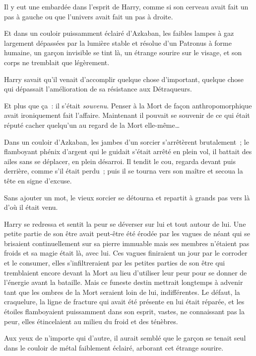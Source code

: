 Il y eut une embardée dans l'esprit de Harry, comme si son cerveau avait fait un pas à gauche ou que l'univers avait fait un pas à droite.

Et dans un couloir puissamment éclairé d'Azkaban, les faibles lampes à gaz largement dépassées par la lumière stable et résolue d'un Patronus à forme humaine, un garçon invisible se tint là, un étrange sourire sur le visage, et son corps ne tremblait que légèrement.

Harry savait qu'il venait d'accomplir quelque chose d'important, quelque chose qui dépassait l'amélioration de sa résistance aux Détraqueurs.

Et plus que ça~: il s'était \emph{souvenu}. Penser à la Mort de façon anthropomorphique avait ironiquement fait l'affaire. Maintenant il pouvait se souvenir de ce qui était réputé cacher quelqu'un au regard de la Mort elle-même…

\later

Dans un couloir d'Azkaban, les jambes d'un sorcier s'arrêtèrent brutalement~; le flamboyant phénix d'argent qui le guidait s'était arrêté en plein vol, il battait des ailes sans se déplacer, en plein désarroi. Il tendit le cou, regarda devant puis derrière, comme s'il était perdu~; puis il se tourna vers son maître et secoua la tête en signe d'excuse.

Sans ajouter un mot, le vieux sorcier se détourna et repartit à grands pas vers là d'où il était venu.

\later

Harry se redressa et sentit la peur se déverser sur lui et tout autour de lui. Une petite partie de son être avait peut-être été érodée par les vagues de néant qui se brisaient continuellement sur sa pierre immuable mais ses membres n'étaient pas froids et sa magie était là, avec lui. Ces vagues finiraient un jour par le corroder et le consumer, elles s'infiltreraient par les petites parties de son être qui tremblaient encore devant la Mort au lieu d'utiliser leur peur pour se donner de l'énergie avant la bataille. Mais ce funeste destin mettrait longtemps à advenir tant que les ombres de la Mort seraient loin de lui, indifférentes. Le défaut, la craquelure, la ligne de fracture qui avait été présente en lui était réparée, et les étoiles flamboyaient puissamment dans son esprit, vastes, ne connaissant pas la peur, elles étincelaient au milieu du froid et des ténèbres.

Aux yeux de n'importe qui d'autre, il aurait semblé que le garçon se tenait seul dans le couloir de métal faiblement éclairé, arborant cet étrange sourire.

